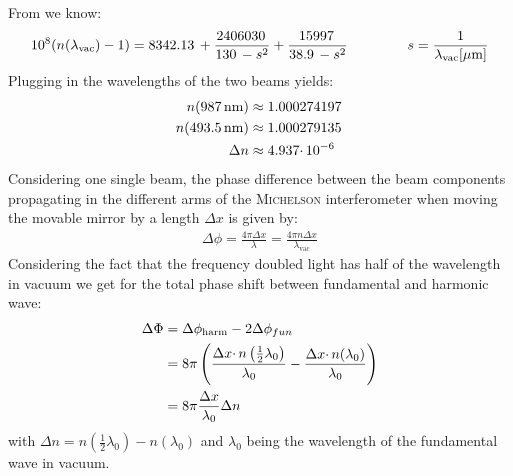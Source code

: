 \documentclass{protokoll_en}
\begin{document}
From \cite{paper} we know:
\begin{align}
10^8(n(\lambda_\textrm{vac})-1)=\unit[8342.13]{} + \frac{\unit[2406030]{}}{\unit[130]{} - s^2} + \frac{\unit[15997]{}}{\unit[38.9]{}-s^2} \hspace{1.5cm} s=\frac{1}{\lambda_\textrm{vac}[\mu\textrm{m}]}
\end{align}
Plugging in the wavelengths of the two beams yields:
\begin{align}
n(\unit[987]{nm}) &\approx \unit[1.000274197]{}\\
\notag n(\unit[493.5]{nm}) &\approx \unit[1.000279135]{}\\
\notag\Delta n &\approx \unit[4.937\cdotp 10^{-6}]{}
\end{align}
Considering one single beam, the phase difference between the beam components propagating in the different arms of the \textsc{Michelson} interferometer when moving the movable mirror by a length $\Delta x$ is given by:
\begin{align}
\Delta \phi = \frac{4\pi\Delta x}{\lambda}=\frac{4\pi n\Delta x}{\lambda_\textrm{vac}}
\end{align}
Considering the fact that the frequency doubled light has half of the wavelength in vacuum we get for the total phase shift between fundamental and harmonic wave:
\begin{align}
\Delta \Phi &= \Delta \phi_\textrm{harm} - 2\Delta \phi_{fun}\\
\notag &= 8\pi\left(\frac{\Delta x \cdotp n\left(\frac{1}{2}\lambda_0\right)}{\lambda_0} - \frac{\Delta x\cdotp n(\lambda_0)}{\lambda_0}\right)\\
\notag &= 8\pi\frac{\Delta x}{\lambda_0} \Delta n
\end{align}
with $\Delta n = n\left(\frac{1}{2}\lambda_0\right)-n(\lambda_0)$ and $\lambda_0$ being the wavelength of the fundamental wave in vacuum.
\end{document}
